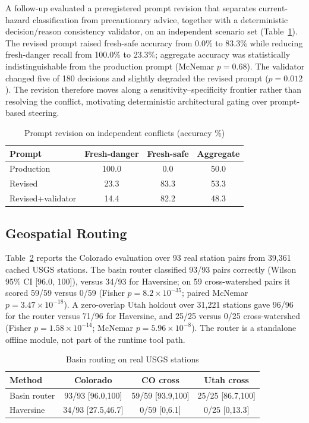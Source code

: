 \documentclass[conference]{IEEEtran}
\begin{document}
A follow-up evaluated a preregistered prompt revision that separates current-hazard classification from precautionary advice, together with a deterministic decision/reason consistency validator, on an independent scenario set (Table~\ref{tab:pareto}). The revised prompt raised fresh-safe accuracy from 0.0\% to 83.3\% while reducing fresh-danger recall from 100.0\% to 23.3\%; aggregate accuracy was statistically indistinguishable from the production prompt (McNemar $p=0.68$). The validator changed five of 180 decisions and slightly degraded the revised prompt ($p=0.012$). The revision therefore moves along a sensitivity--specificity frontier rather than resolving the conflict, motivating deterministic architectural gating over prompt-based steering.
\begin{table}[t]
\caption{Prompt revision on independent conflicts (accuracy \%)}
\label{tab:pareto}
\centering\scriptsize\setlength{\tabcolsep}{3pt}
\begin{tabular*}{\columnwidth}{@{\extracolsep{\fill}}lccc@{}}
\toprule
Prompt & Fresh-danger & Fresh-safe & Aggregate \\
\midrule
Production & 100.0 & 0.0 & 50.0 \\
Revised & 23.3 & 83.3 & 53.3 \\
Revised+validator & 14.4 & 82.2 & 48.3 \\
\bottomrule
\end{tabular*}
\end{table}

\subsection{Geospatial Routing}
Table~\ref{tab:geoexp} reports the Colorado evaluation over 93 real station pairs from 39,361 cached USGS stations. The basin router classified 93/93 pairs correctly (Wilson 95\% CI [96.0, 100]), versus 34/93 for Haversine; on 59 cross-watershed pairs it scored 59/59 versus 0/59 (Fisher $p=8.2\times10^{-35}$; paired McNemar $p=3.47\times10^{-18}$). A zero-overlap Utah holdout over 31,221 stations gave 96/96 for the router versus 71/96 for Haversine, and 25/25 versus 0/25 cross-watershed (Fisher $p=1.58\times10^{-14}$; McNemar $p=5.96\times10^{-8}$). The router is a standalone offline module, not part of the runtime tool path.
\begin{table}[t]
\caption{Basin routing on real USGS stations}
\label{tab:geoexp}
\centering\scriptsize\setlength{\tabcolsep}{3pt}
\begin{tabular*}{\columnwidth}{@{\extracolsep{\fill}}lccc@{}}
\toprule
Method & Colorado & CO cross & Utah cross \\
\midrule
Basin router & 93/93 [96.0,100] & 59/59 [93.9,100] & 25/25 [86.7,100] \\
Haversine & 34/93 [27.5,46.7] & 0/59 [0,6.1] & 0/25 [0,13.3] \\
\bottomrule
\end{tabular*}
\end{table}
\end{document}
